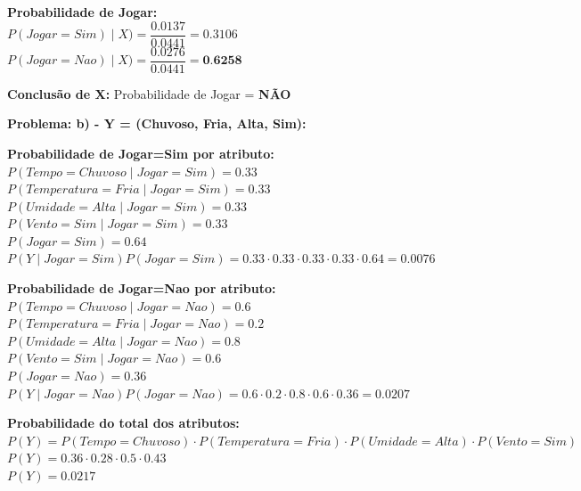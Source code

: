 \documentclass{article}
\begin{document}
  \begin{tabbing}
    \textbf{Probabilidade de Jogar:}\\
    $P(Jogar=Sim) \mid X) = \dfrac{0.0137}{0.0441} = 0.3106$ \\
    $P(Jogar=Nao) \mid X) = \dfrac{0.0276}{0.0441} = \textbf{0.6258}$
  \end{tabbing}

  \begin{tabbing}
    \textbf{Conclusão de X:}
    Probabilidade de Jogar = \textbf{NÃO}\\
  \end{tabbing}  

  \textbf{\large Problema: b) - Y = (Chuvoso, Fria, Alta, Sim):}
  
  \begin{tabbing}
    \textbf{Probabilidade de Jogar=Sim por atributo:}\\
    $P(Tempo=Chuvoso \mid Jogar = Sim) =  0.33 $ \\
    $P(Temperatura=Fria \mid Jogar = Sim)  = 0.33 $ \\
    $P(Umidade=Alta \mid Jogar = Sim)  = 0.33 $ \\
    $P(Vento=Sim \mid Jogar = Sim) = 0.33 $ \\
    $P(Jogar=Sim) = 0.64$ \\
    $P(Y \mid Jogar=Sim)P(Jogar=Sim) = 0.33 \cdot 0.33 \cdot 0.33 \cdot 0.33 \cdot 0.64 = 0.0076$ \\
  \end{tabbing}

  
  \begin{tabbing}
    \textbf{Probabilidade de Jogar=Nao por atributo:}\\
    $P(Tempo=Chuvoso \mid Jogar = Nao) =  0.6 $ \\
    $P(Temperatura=Fria \mid Jogar = Nao)  = 0.2 $ \\
    $P(Umidade=Alta \mid Jogar = Nao)  = 0.8 $ \\
    $P(Vento=Sim \mid Jogar = Nao) = 0.6 $ \\
    $P(Jogar=Nao) = 0.36$ \\
    $P(Y \mid Jogar=Nao)P(Jogar=Nao) = 0.6 \cdot 0.2 \cdot 0.8 \cdot 0.6 \cdot 0.36 = 0.0207$ \\
  \end{tabbing}

  
  \begin{tabbing}
    \textbf{Probabilidade do total dos atributos:}\\
    $P(Y) = P(Tempo=Chuvoso) \cdot P(Temperatura=Fria) \cdot P(Umidade=Alta) \cdot P(Vento=Sim)$ \\
    $P(Y) = 0.36 \cdot 0.28 \cdot 0.5 \cdot 0.43$ \\
    $P(Y) = 0.0217$  
  \end{tabbing}
  
\end{document}
